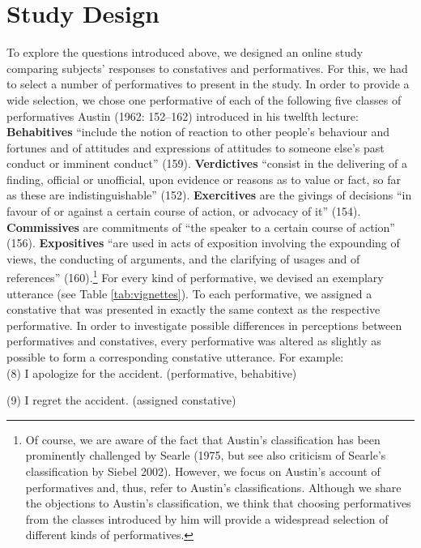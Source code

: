 \documentclass[egregdoesnotlikesansseriftitles,12pt]{scrartcl}
\begin{document}
\section{Study Design}\label{sec:design}
To explore the questions introduced above, we designed an online study comparing subjects' responses to constatives and performatives. For this, we had to select a number of performatives to present in the study. In order to provide a wide selection, we chose one performative of each of the following five classes of performatives Austin (1962: 152--162) introduced in his twelfth lecture: \textbf{Behabitives} ``include the notion of reaction to other people's behaviour and fortunes and of attitudes and expressions of attitudes to someone else's past conduct or imminent conduct'' (159). \textbf{Verdictives} ``consist in the delivering of a finding, official or unofficial, upon evidence or reasons as to value or fact, so far as these are indistinguishable'' (152). \textbf{Exercitives} are the givings of decisions ``in favour of or against a certain course of action, or advocacy of it'' (154). \textbf{Commissives} are commitments of ``the speaker to a certain course of action'' (156). \textbf{Expositives} ``are used in acts of exposition involving the expounding of views, the conducting of arguments, and the clarifying of usages and of references'' (160).\footnote{Of course, we are aware of the fact that Austin's classification has been prominently challenged by Searle (1975, but see also criticism of Searle's classification by Siebel 2002). However, we focus on Austin's account of performatives and, thus, refer to Austin's classifications. Although we share the objections to Austin's classification, we think that choosing performatives from the classes introduced by him will provide a widespread selection of different kinds of performatives.} For every kind of performative, we devised an exemplary utterance (see Table \ref{tab:vignettes}). To each performative, we assigned a constative that was presented in exactly the same context as the respective performative. In order to investigate possible differences in perceptions between performatives and constatives, every performative was altered as slightly as possible to form a corresponding constative utterance. For example:\\

(8) I apologize for the accident. (performative, behabitive)\par
(9) I regret the accident. (assigned constative)\\
\end{document}
